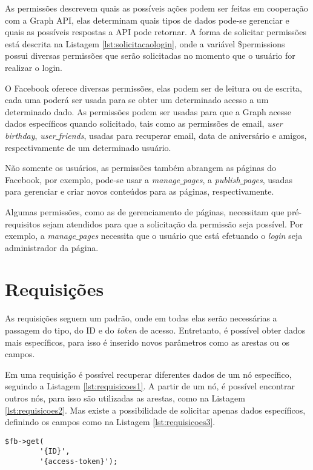 As permissões descrevem quais as possíveis ações podem ser feitas em cooperação com a Graph API, elas determinam quais tipos de dados pode-se gerenciar e quais as possíveis respostas a API pode retornar. A forma de solicitar permissões está descrita na Listagem \ref{lst:solicitacaologin}, onde a variável \$permissions possui diversas permissões que serão solicitadas no momento que o usuário for realizar o login.

O Facebook oferece diversas permissões, elas podem ser de leitura ou de escrita, cada uma poderá ser usada para se obter um determinado acesso a um determinado dado. As permissões podem ser usadas para que a Graph acesse dados específicos quando solicitado, tais como as permissões de email, \textit{user\underline{{ }}birthday}, \textit{user\underline{{ }}friends}, usadas para recuperar email, data de aniversário e amigos, respectivamente de um determinado usuário.

Não somente os usuários, as permissões também abrangem as páginas do Facebook, por exemplo, pode-se usar a \textit{manage\underline{{ }}pages}, a \textit{publish\underline{{ }}pages}, usadas para gerenciar e criar novos conteúdos para as páginas, respectivamente.

Algumas permissões, como as de gerenciamento de páginas, necessitam que pré-requisitos sejam atendidos para que a solicitação da permissão seja possível. Por exemplo, a \textit{manage\underline{{ }}pages} necessita que o usuário que está efetuando o \textit{login} seja administrador da página.

\section{Requisições}
As requisições seguem um padrão, onde em todas elas serão necessárias a passagem do tipo, do ID e do \textit{token} de acesso. Entretanto, é possível obter dados mais específicos, para isso é inserido novos parâmetros como as arestas ou os campos. 

Em uma requisição é possível recuperar diferentes dados de um nó específico, seguindo a Listagem \ref{lst:requisicoes1}. A partir de um nó, é possível encontrar outros nós, para isso são utilizadas as arestas, como na Listagem \ref{lst:requisicoes2}. Mas existe a possibilidade de solicitar apenas dados específicos, definindo os campos como na Listagem \ref{lst:requisicoes3}.  

\begin{lstlisting}[caption={Requisição com o uso do ID},label={lst:requisicoes1}]
	$fb->get(
    	'{ID}',
    	'{access-token}');
\end{lstlisting}

